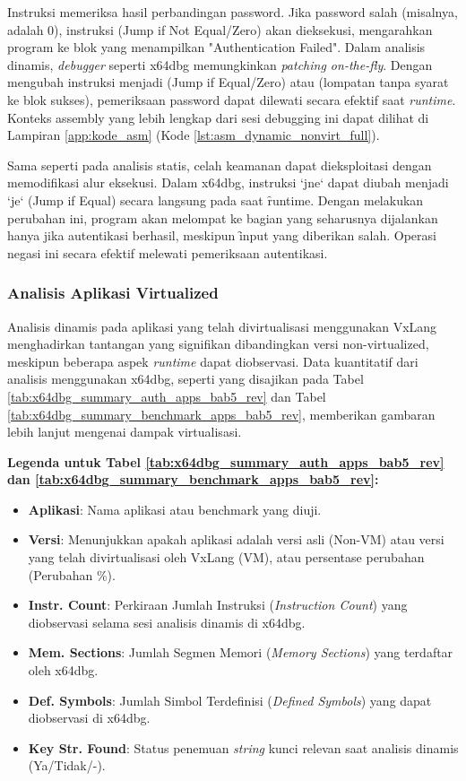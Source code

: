 Instruksi  memeriksa hasil perbandingan password. Jika password salah (misalnya,  adalah 0), instruksi  (Jump if Not Equal/Zero) akan dieksekusi, mengarahkan program ke blok yang menampilkan "Authentication Failed". Dalam analisis dinamis, \textit{debugger} seperti x64dbg memungkinkan \textit{patching on-the-fly}. Dengan mengubah instruksi  menjadi  (Jump if Equal/Zero) atau  (lompatan tanpa syarat ke blok sukses), pemeriksaan password dapat dilewati secara efektif saat \textit{runtime}. Konteks assembly yang lebih lengkap dari sesi debugging ini dapat dilihat di Lampiran \ref{app:kode_asm} (Kode \ref{lst:asm_dynamic_nonvirt_full}).

Sama seperti pada analisis statis, celah keamanan dapat dieksploitasi dengan memodifikasi alur eksekusi. Dalam x64dbg, instruksi `jne` dapat diubah menjadi `je` (Jump if Equal) secara langsung pada saat \f{runtime}. Dengan melakukan perubahan ini, program akan melompat ke bagian yang seharusnya dijalankan hanya jika autentikasi berhasil, meskipun \f{input} yang diberikan salah. Operasi negasi ini secara efektif melewati pemeriksaan autentikasi.

\subsubsection{Analisis Aplikasi Virtualized}

Analisis dinamis pada aplikasi yang telah divirtualisasi menggunakan VxLang menghadirkan tantangan yang signifikan dibandingkan versi non-virtualized, meskipun beberapa aspek \textit{runtime} dapat diobservasi. Data kuantitatif dari analisis menggunakan x64dbg, seperti yang disajikan pada Tabel \ref{tab:x64dbg_summary_auth_apps_bab5_rev} dan Tabel \ref{tab:x64dbg_summary_benchmark_apps_bab5_rev}, memberikan gambaran lebih lanjut mengenai dampak virtualisasi.

\noindent \textbf{Legenda untuk Tabel \ref{tab:x64dbg_summary_auth_apps_bab5_rev} dan \ref{tab:x64dbg_summary_benchmark_apps_bab5_rev}:}
\begin{itemize}
    \item \textbf{Aplikasi}: Nama aplikasi atau benchmark yang diuji.
    \item \textbf{Versi}: Menunjukkan apakah aplikasi adalah versi asli (Non-VM) atau versi yang telah divirtualisasi oleh VxLang (VM), atau persentase perubahan (Perubahan \%).
    \item \textbf{Instr. Count}: Perkiraan Jumlah Instruksi (\textit{Instruction Count}) yang diobservasi selama sesi analisis dinamis di x64dbg.
    \item \textbf{Mem. Sections}: Jumlah Segmen Memori (\textit{Memory Sections}) yang terdaftar oleh x64dbg.
    \item \textbf{Def. Symbols}: Jumlah Simbol Terdefinisi (\textit{Defined Symbols}) yang dapat diobservasi di x64dbg.
    \item \textbf{Key Str. Found}: Status penemuan \textit{string} kunci relevan saat analisis dinamis (Ya/Tidak/-).
\end{itemize}

